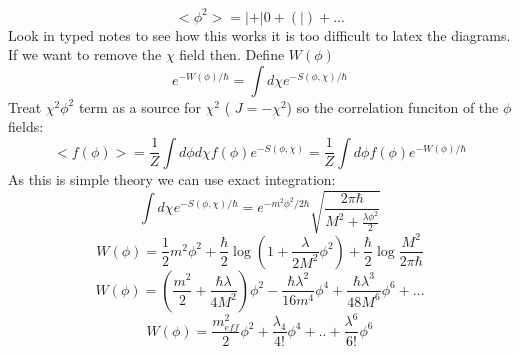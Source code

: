 \documentclass{article}
\begin{document}
$$
< \phi^2> = | + |0 + (|) + ...
$$
Look in typed notes to see how this works it is too difficult to latex the diagrams. If we want to remove the $\chi$ field then. Define $W(\phi)$
$$
e^{- W(\phi) /\hbar} = \int d\chi e^{- S(\phi, \chi)/\hbar}
$$
Treat $\chi^2 \phi^2$ term as a source for $\chi^2$ ( $J = - \chi^2$) so the correlation funciton of the $\phi$ fields:
$$
< f( \phi)> = \frac{1}{Z} \int d\phi d\chi f(\phi) e^{- S(\phi, \chi)} = \frac{1}{Z} \int d\phi f(\phi) e^{- W(\phi) / \hbar}
$$
As this is simple theory we can use exact integration:
$$
\int d\chi e^{- S(\phi, \chi)/\hbar} = e^{- m^2 \phi^2 /2 \hbar} \sqrt{ \frac{ 2\pi \hbar}{ M^2 + \frac{\lambda \phi^2}{2}}}
$$
$$
W(\phi) = \frac{1}{2} m^2 \phi^2 + \frac{\hbar}{2} \log (1 + \frac{\lambda}{2 M^2} \phi^2) + \frac{\hbar}{2} \log \frac{M^2}{2\pi \hbar}
$$
$$
W(\phi) = ( \frac{m^2}{2} + \frac{\hbar \lambda}{4M^2} )\phi^2 - \frac{\hbar \lambda^2}{16 m^4} \phi^4 + \frac{\hbar \lambda^3}{48 M^6} \phi^6 + ...
$$
 $$
 W(\phi) = \frac{m^2_{eff}}{2} \phi^2 + \frac{\lambda_4}{4!} \phi^4 + .. + \frac{\lambda^6}{6!} \phi^6
 $$
\end{document}
